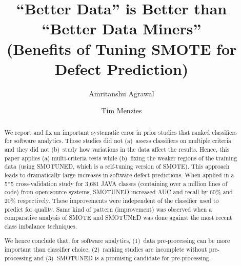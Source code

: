 \documentclass[sigconf,review, anonymous]{acmart}
\theoremstyle{break}
\theoremstyle{break}
\newcommand{\sma}{{\sc SMOTE}}
\newcommand{\smb}{{\sc SMOTUNED}}
\begin{document}

\title{``Better Data'' is Better than ``Better Data Miners''\\ (Benefits of Tuning SMOTE for Defect Prediction) }



\author{Amritanshu Agrawal}

\author{Tim Menzies}
\pagestyle{plain}

\begin{abstract}
We report and fix an important systematic error in prior
studies that ranked classifiers for software analytics.
Those studies  did  not (a)~assess classifiers on multiple   criteria
and they did not 
(b)~study  how variations in the  data affect the results. 
Hence, 
this paper applies (a)  multi-criteria tests while (b)~fixing the weaker regions of the training
 data (using {\smb}, which is a self-tuning version of {\sma}).
This approach
leads to dramatically large increases in software defect predictions.
When applied in a 5*5 cross-validation study for  3,681	JAVA classes (containing over a million lines of code) from open source  systems,
{\smb} increased
AUC and recall by 60\% and 20\% respectively. 
These improvements were independent of the classifier used to
predict for quality. Same kind of pattern (improvement) was observed when a comparative analysis of {\sma} and {\smb} was done against the most recent class imbalance techniques.

We hence conclude that, for  software analytics, (1)~data
pre-processing can be more important than  classifier
choice,
(2)~ranking studies  are  incomplete  without
 pre-processing and
(3)~{\smb} is a   promising candidate for  pre-processing.

\end{abstract}
\end{document}
